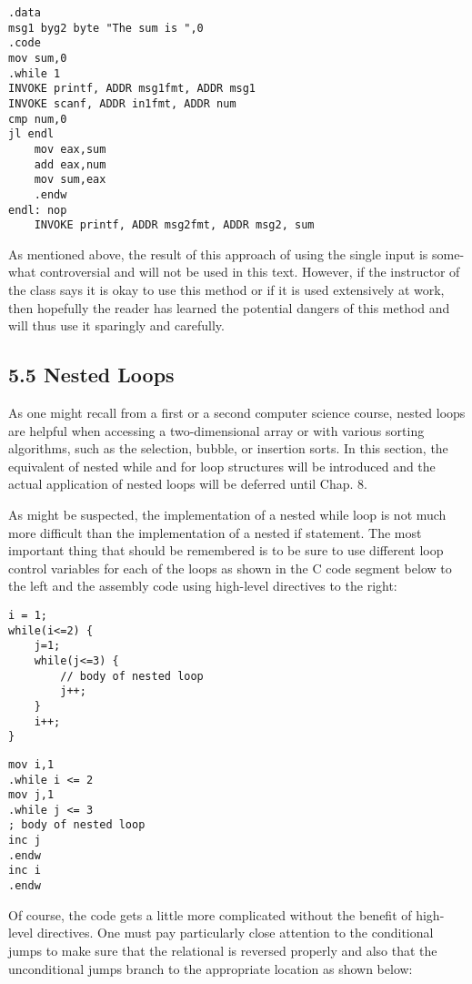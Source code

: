 \documentclass[10pt]{article}
\begin{document}
\begin{verbatim}
.data
msg1 byg2 byte "The sum is ",0
.code
mov sum,0
.while 1
INVOKE printf, ADDR msg1fmt, ADDR msg1
INVOKE scanf, ADDR in1fmt, ADDR num
cmp num,0
jl endl
    mov eax,sum
    add eax,num
    mov sum,eax
    .endw
endl: nop
    INVOKE printf, ADDR msg2fmt, ADDR msg2, sum
\end{verbatim}

As mentioned above, the result of this approach of using the single input is some-what controversial and will not be used in this text. However, if the instructor of the class says it is okay to use this method or if it is used extensively at work, then hopefully the reader has learned the potential dangers of this method and will thus use it sparingly and carefully.

\subsection*{5.5 Nested Loops}
As one might recall from a first or a second computer science course, nested loops are helpful when accessing a two-dimensional array or with various sorting algorithms, such as the selection, bubble, or insertion sorts. In this section, the equivalent of nested while and for loop structures will be introduced and the actual application of nested loops will be deferred until Chap. 8.

As might be suspected, the implementation of a nested while loop is not much more difficult than the implementation of a nested if statement. The most important thing that should be remembered is to be sure to use different loop control variables for each of the loops as shown in the C code segment below to the left and the assembly code using high-level directives to the right:

\begin{verbatim}
i = 1;
while(i<=2) {
    j=1;
    while(j<=3) {
        // body of nested loop
        j++;
    }
    i++;
}
\end{verbatim}

\begin{verbatim}
mov i,1
.while i <= 2
mov j,1
.while j <= 3
; body of nested loop
inc j
.endw
inc i
.endw
\end{verbatim}

Of course, the code gets a little more complicated without the benefit of high-level directives. One must pay particularly close attention to the conditional jumps to make sure that the relational is reversed properly and also that the unconditional jumps branch to the appropriate location as shown below:
\end{document}
